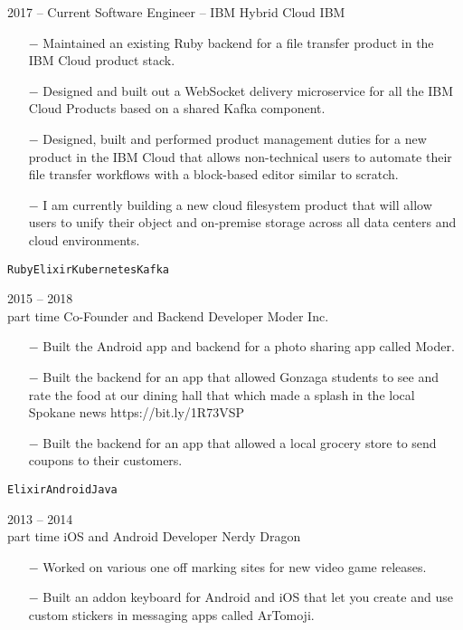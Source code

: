 \documentclass[9pt]{developercv} %
\begin{document}
\begin{entrylist}
	\entry
		{2017 -- Current}
		{Software Engineer \textnormal{-- IBM Hybrid Cloud}}
		{IBM}
		{
			\vspace*{-\baselineskip}
			\begin{itemize}
				\item[$-$] Maintained an existing Ruby backend for a file transfer product in the IBM Cloud product stack.
				\item[$-$] Designed and built out a WebSocket delivery microservice for all the IBM Cloud Products based on a shared Kafka component. 
				\item[$-$] Designed, built and performed product management duties for a new product in the IBM Cloud that allows non-technical users to automate their file transfer workflows with a block-based editor similar to scratch.
				\item[$-$] I am currently building a new cloud filesystem product that will allow users to unify their object and on-premise storage across all data centers and cloud environments.
			\end{itemize}
			\texttt{Ruby}\slashsep\texttt{Elixir}\slashsep\texttt{Kubernetes}\slashsep\texttt{Kafka}}
	\entry
		{2015 -- 2018\\\footnotesize{part time}}
		{Co-Founder and Backend Developer}
		{Moder Inc.}
		{
			\vspace*{-\baselineskip}
			\begin{itemize}
				\item[$-$] Built the Android app and backend for a photo sharing app called Moder.
				\item[$-$] Built the backend for an app that allowed Gonzaga students to see and rate the food at our dining hall that which made a splash in the local Spokane news https://bit.ly/1R73VSP
				\item[$-$] Built the backend for an app that allowed a local grocery store to send coupons to their customers.
			\end{itemize}
			\texttt{Elixir}\slashsep\texttt{Android}\slashsep\texttt{Java}}
	\entry
		{2013 -- 2014\\\footnotesize{part time}}
		{iOS and Android Developer}
		{Nerdy Dragon}
		{
			\vspace*{-\baselineskip}
			\begin{itemize}
				\item[$-$] Worked on various one off marking sites for new video game releases.
				\item[$-$] Built an addon keyboard for Android and iOS that let you create and use custom stickers in messaging apps called ArTomoji.

\end{itemize}}
\end{entrylist}
\end{document}
